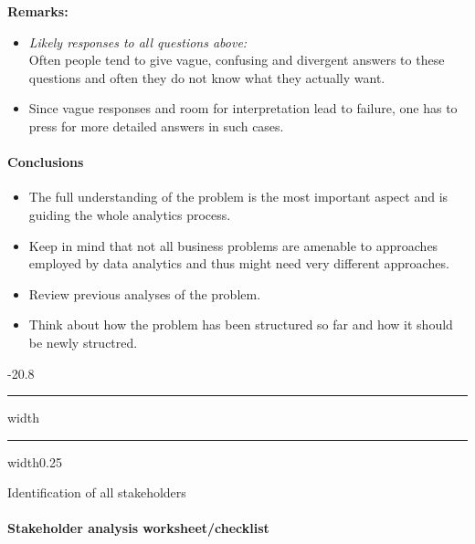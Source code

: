 \documentclass[a4paper, landscape, 6pt, fleqn]{scrartcl}
\makeatletter
\renewcommand{\emph}[1]{\textbf{#1}}
\renewcommand{\subsection}{\@startsection{subsection}{1}{0mm}%
{-2\baselineskip}{0.8\baselineskip}%
{\hrule depth 0.2pt width\columnwidth\hrule depth0.75pt
width0.25\columnwidth\vspace*{1.2em}\large\bfseries}}
\makeatother
\begin{document}
\begin{multicols*}{4}
\emph{Remarks:}
\begin{itemize}
\item \textit{Likely responses to all questions above:} \\
Often people tend to give vague, confusing and divergent answers to these questions and often they do not know what they actually want.
\item Since vague responses and room for interpretation lead to failure, one has to press for more detailed answers in such cases.
\end{itemize}

\paragraph{Conclusions}

\begin{itemize}
\item The full understanding of the problem is the most important aspect and is guiding the whole analytics process.
\item Keep in mind that not all business problems are amenable to approaches employed by data analytics and thus might need very different approaches.
\item Review previous analyses of the problem.
\item Think about how the problem has been structured so far and how it should be newly structred.
\end{itemize}

\subsection{Identification of all stakeholders}

\paragraph{Stakeholder analysis worksheet/checklist}


\end{multicols*}
\end{document}
